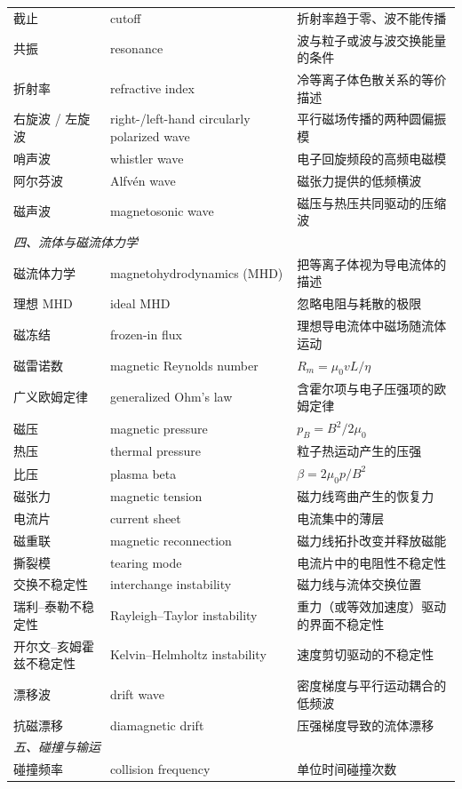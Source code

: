 \documentclass[12pt,a4paper,openany,oneside]{book}
\begin{document}
{\begin{longtable}{@{}p{4.2cm}p{5.6cm}p{4.8cm}@{}}
截止 & cutoff & 折射率趋于零、波不能传播 \\
共振 & resonance & 波与粒子或波与波交换能量的条件 \\
折射率 & refractive index & 冷等离子体色散关系的等价描述 \\
右旋波 / 左旋波 & right-/left-hand circularly polarized wave & 平行磁场传播的两种圆偏振模 \\
哨声波 & whistler wave & 电子回旋频段的高频电磁模 \\
阿尔芬波 & Alfvén wave & 磁张力提供的低频横波 \\
磁声波 & magnetosonic wave & 磁压与热压共同驱动的压缩波 \\
\multicolumn{3}{l}{\textit{四、流体与磁流体力学}} \\
\midrule
磁流体力学 & magnetohydrodynamics (MHD) & 把等离子体视为导电流体的描述 \\
理想 MHD & ideal MHD & 忽略电阻与耗散的极限 \\
磁冻结 & frozen-in flux & 理想导电流体中磁场随流体运动 \\
磁雷诺数 & magnetic Reynolds number & $R_m = \mu_0vL/\eta$ \\
广义欧姆定律 & generalized Ohm's law & 含霍尔项与电子压强项的欧姆定律 \\
磁压 & magnetic pressure & $p_B = B^2/2\mu_0$ \\
热压 & thermal pressure & 粒子热运动产生的压强 \\
比压 & plasma beta & $\beta = 2\mu_0p/B^2$ \\
磁张力 & magnetic tension & 磁力线弯曲产生的恢复力 \\
电流片 & current sheet & 电流集中的薄层 \\
磁重联 & magnetic reconnection & 磁力线拓扑改变并释放磁能 \\
撕裂模 & tearing mode & 电流片中的电阻性不稳定性 \\
交换不稳定性 & interchange instability & 磁力线与流体交换位置 \\
瑞利--泰勒不稳定性 & Rayleigh--Taylor instability & 重力（或等效加速度）驱动的界面不稳定性 \\
开尔文--亥姆霍兹不稳定性 & Kelvin--Helmholtz instability & 速度剪切驱动的不稳定性 \\
漂移波 & drift wave & 密度梯度与平行运动耦合的低频波 \\
抗磁漂移 & diamagnetic drift & 压强梯度导致的流体漂移 \\
\multicolumn{3}{l}{\textit{五、碰撞与输运}} \\
\midrule
碰撞频率 & collision frequency & 单位时间碰撞次数 \\

\end{longtable}}
\end{document}

